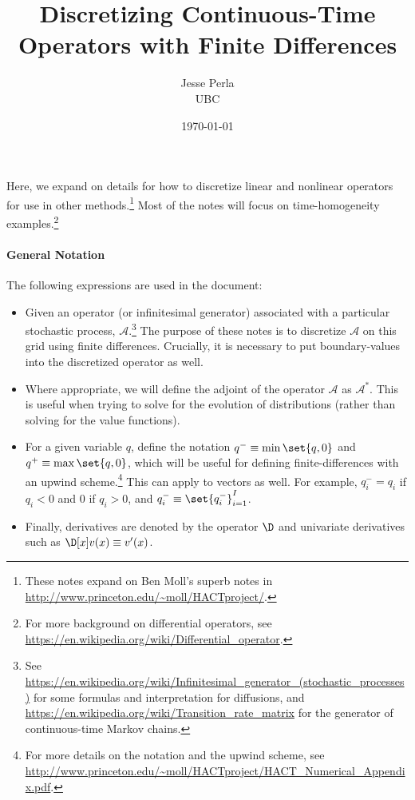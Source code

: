 \documentclass[11pt]{etk-article}
\begin{document}
\title{Discretizing Continuous-Time Operators with Finite Differences}
\author{Jesse Perla\\UBC}
\date{\today}
\maketitle
 Here, we expand on details for how to discretize linear and nonlinear operators for use in other methods.\footnote{These notes expand on Ben Moll's superb notes in \url{http://www.princeton.edu/~moll/HACTproject/}. }  Most of the notes will focus on time-homogeneity examples.\footnote{For more background on differential operators, see \url{https://en.wikipedia.org/wiki/Differential_operator}.}
\paragraph{General Notation} The following expressions are used in the document:
\begin{itemize}
	\item Given an operator (or infinitesimal generator) associated with a particular stochastic process, $\mathcal{A}$.\footnote{See \url{https://en.wikipedia.org/wiki/Infinitesimal_generator_(stochastic_processes)} for some formulas and interpretation for diffusions, and \url{https://en.wikipedia.org/wiki/Transition_rate_matrix} for the generator of continuous-time Markov chains.}  The purpose of these notes is to discretize $\mathcal{A}$ on this grid using finite differences.  Crucially, it is necessary to put boundary-values into the discretized operator as well. 
	\item Where appropriate, we will define the adjoint of the operator $\mathcal{A}$ as $\mathcal{A}^*$.  This is useful when trying to solve for the evolution of distributions (rather than solving for the value functions).
	\item For a given variable $q$, define the notation $q^{-} \equiv \min\set{q,0}$ and $q^{+} \equiv \max\set{q,0}$, which will be useful for defining finite-differences with an upwind scheme.\footnote{For more details on the notation and the upwind scheme, see \url{http://www.princeton.edu/~moll/HACTproject/HACT_Numerical_Appendix.pdf}.}   This can apply to vectors as well. For example, $q_i^{-} = q_i$ if $q_i < 0$ and $0$ if $q_i > 0$, and $q_i^{-} \equiv \set{q^{-}_i}_{i=1}^{I}$.
	\item Finally,  derivatives are denoted by the operator $\D$ and univariate derivatives such as $\D[x]v(x) \equiv v'(x)$.	
\end{itemize}
\end{document}
